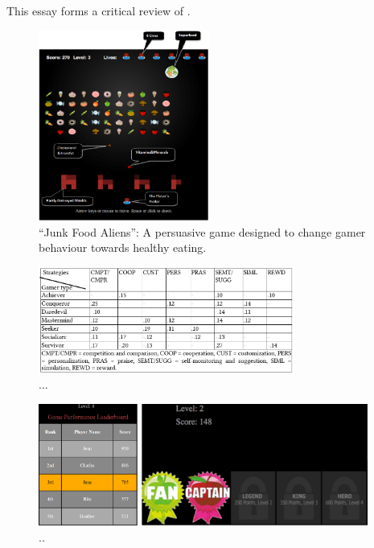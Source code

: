 \documentclass[12pt]{article}
\begin{document}
This essay forms a critical review of \citet{orji2017}.

\begin{figure}[H]
\centering
\includegraphics[width=0.5\textwidth]{img/orji2017-junk-food-aliens.png} 
\caption{``Junk Food Aliens'': A persuasive game designed to change gamer behaviour towards healthy eating.}\label{fig:orji2017-junk-food-aliens}
\end{figure}

\begin{figure}[H]
\centering
\includegraphics[width=0.75\textwidth]{img/orji2017-beta-sem.png} 
\caption{...}\label{fig:orji2017-beta-sem}
\end{figure}

\begin{figure}[H]
\centering
  \includegraphics[height=4cm]{img/orji2017-junk-food-aliens-competition.png}
  \caption{...}\label{fig:orji2017-junk-food-aliens-competition}
\endminipage\hfill
{}%
\centering
  \includegraphics[height=4cm]{img/orji2017-junk-food-aliens-reward.png}
  \caption{..}\label{fig:orji2017-junk-food-aliens-reward}
\endminipage
\end{figure}
\end{document}
